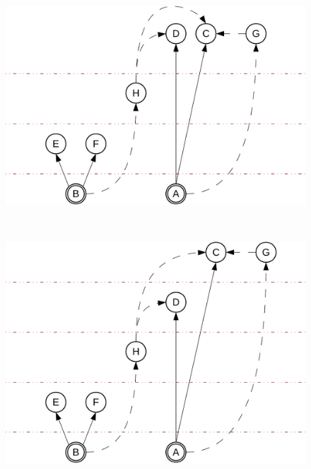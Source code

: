 \begin{figure}[th!b]
\begin{minipage}[b]{0.5\linewidth}
    \centering
    \includegraphics[scale=0.4]{figures/complementation/steps-3.pdf}
    \label{hiercomp/fig:multiple:steps:3}
  \end{minipage}
  \vspace{0mm}
  \\
  \begin{minipage}[b]{0.5\linewidth}
    \centering
    \includegraphics[scale=0.4]{figures/complementation/steps-4.pdf}
    \label{hiercomp/fig:multiple:steps:4}
  \end{minipage}
  \begin{minipage}[b]{0.5\linewidth}
    \centering

\end{minipage}
\end{figure}
